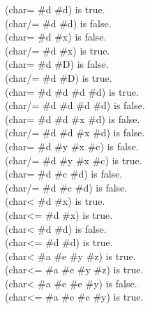 \begin{defun}[Function]
\begin{lisp}
(char= \#{\Xbackslash}d \#{\Xbackslash}d) \textrm{is true.} \\
(char/= \#{\Xbackslash}d \#{\Xbackslash}d) \textrm{is false.} \\
(char= \#{\Xbackslash}d \#{\Xbackslash}x) \textrm{is false.} \\
(char/= \#{\Xbackslash}d \#{\Xbackslash}x) \textrm{is true.} \\
(char= \#{\Xbackslash}d \#{\Xbackslash}D) \textrm{is false.} \\
(char/= \#{\Xbackslash}d \#{\Xbackslash}D) \textrm{is true.} \\
(char= \#{\Xbackslash}d \#{\Xbackslash}d \#{\Xbackslash}d \#{\Xbackslash}d) \textrm{is true.} \\
(char/= \#{\Xbackslash}d \#{\Xbackslash}d \#{\Xbackslash}d \#{\Xbackslash}d) \textrm{is false.} \\
(char= \#{\Xbackslash}d \#{\Xbackslash}d \#{\Xbackslash}x \#{\Xbackslash}d) \textrm{is false.} \\
(char/= \#{\Xbackslash}d \#{\Xbackslash}d \#{\Xbackslash}x \#{\Xbackslash}d) \textrm{is false.} \\
(char= \#{\Xbackslash}d \#{\Xbackslash}y \#{\Xbackslash}x \#{\Xbackslash}c) \textrm{is false.} \\
(char/= \#{\Xbackslash}d \#{\Xbackslash}y \#{\Xbackslash}x \#{\Xbackslash}c) \textrm{is true.} \\
(char= \#{\Xbackslash}d \#{\Xbackslash}c \#{\Xbackslash}d) \textrm{is false.} \\
(char/= \#{\Xbackslash}d \#{\Xbackslash}c \#{\Xbackslash}d) \textrm{is false.} \\
(char< \#{\Xbackslash}d \#{\Xbackslash}x) \textrm{is true.} \\
(char<= \#{\Xbackslash}d \#{\Xbackslash}x) \textrm{is true.} \\
(char< \#{\Xbackslash}d \#{\Xbackslash}d) \textrm{is false.} \\
(char<= \#{\Xbackslash}d \#{\Xbackslash}d) \textrm{is true.} \\
(char< \#{\Xbackslash}a \#{\Xbackslash}e \#{\Xbackslash}y \#{\Xbackslash}z) \textrm{is true.} \\
(char<= \#{\Xbackslash}a \#{\Xbackslash}e \#{\Xbackslash}y \#{\Xbackslash}z) \textrm{is true.} \\
(char< \#{\Xbackslash}a \#{\Xbackslash}e \#{\Xbackslash}e \#{\Xbackslash}y) \textrm{is false.} \\
(char<= \#{\Xbackslash}a \#{\Xbackslash}e \#{\Xbackslash}e \#{\Xbackslash}y) \textrm{is true.} \\

\end{lisp}
\end{defun}
